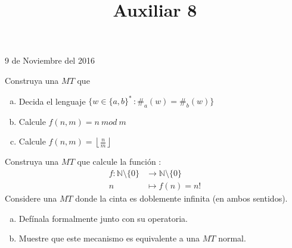 \documentclass[dcc]{fcfmcourse}
\title{Auxiliar 8}
\begin{document}
\maketitle
\begin{center}
9 de Noviembre del 2016
\end{center}
\vspace{-1ex}
\begin{problems}
 \problem Construya una $MT$ que
 \begin{enumerate}[a)]
     \item Decida el lenguaje $\{w \in \{a,b\}^*\,\colon \#_{a}(w)=\#_{b}(w)\}$
     \item Calcule $f(n,m) = n\ mod\ m$
     \item Calcule $f(n,m) = \left \lfloor \frac{n}{m} \right\rfloor$
 \end{enumerate}
\problem Construya una $MT$ que calcule la función :
\begin{align*}
    f\colon \mathbb{N}\setminus \{0\} &\to  \mathbb{N}\setminus \{0\}\\
     n &\mapsto f(n) = n!
\end{align*}
\problem Considere una $MT$ donde la cinta es doblemente infinita (en ambos sentidos).
\begin{enumerate}[a)]
    \item Defínala formalmente junto con su operatoria.
    \item Muestre que este mecanismo es equivalente a una $MT$  normal.
\end{enumerate}
\end{problems}
\end{document}
